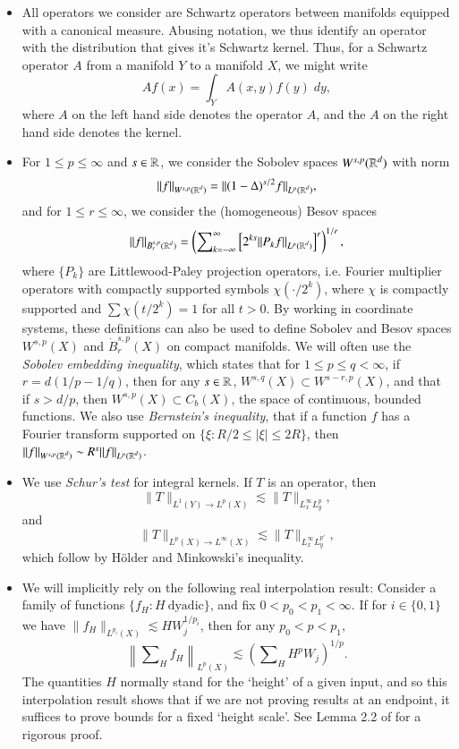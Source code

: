 \begin{itemize}
    \item All operators we consider are Schwartz operators between manifolds equipped with a canonical measure. Abusing notation, we thus identify an operator with the distribution that gives it's Schwartz kernel. Thus, for a Schwartz operator $A$ from a manifold $Y$ to a manifold $X$, we might write
    \[ A f(x) = \int_Y A(x,y) f(y)\; dy, \]
    where $A$ on the left hand side denotes the operator $A$, and the $A$ on the right hand side denotes the kernel.

    \item For $1 \leq p \leq \infty$ and $s \in \operatorname{\mathbb{R}}$, we consider the Sobolev spaces $W^{s,p}(\operatorname{\mathbb{R}}^d)$ with norm
    \[ \| f \|_{W^{s,p}(\operatorname{\mathbb{R}}^d)} = \| (1-\Delta)^{s/2} f \|_{L^p(\operatorname{\mathbb{R}}^d)}, \]
    and for $1 \leq r \leq \infty$, we consider the (homogeneous) Besov spaces
    \[ \| f \|_{\dot{B}^{s,p}_r(\operatorname{\mathbb{R}}^d)} = \left( \sum\nolimits_{k = -\infty}^\infty \left[ 2^{ks} \| P_k f \|_{L^p(\operatorname{\mathbb{R}}^d)} \right]^r \right)^{1/r}, \]
    where $\{ P_k \}$ are Littlewood-Paley projection operators, i.e. Fourier multiplier operators with compactly supported symbols $\chi( \cdot / 2^k )$, where $\chi$ is compactly supported and $\sum \chi(t/2^k) = 1$ for all $t > 0$. By working in coordinate systems, these definitions can also be used to define Sobolev and Besov spaces $W^{s,p}(X)$ and $\dot{B}^{s,p}_r(X)$ on compact manifolds. We will often use the \emph{Sobolev embedding inequality}, which states that for $1 \leq p \leq q < \infty$, if $r = d(1/p - 1/q)$, then for any $s \in \operatorname{\mathbb{R}}$, $W^{s,q}(X) \subset W^{s - r, p}(X)$, and that if $s > d/p$, then $W^{s,p}(X) \subset C_b(X)$, the space of continuous, bounded functions. We also use \emph{Bernstein's inequality}, that if a function $f$ has a Fourier transform supported on $\{ \xi : R/2 \leq |\xi| \leq 2R \}$, then $\| f \|_{W^{s,p}(\operatorname{\mathbb{R}}^d)} \sim R^s \| f \|_{L^p(\operatorname{\mathbb{R}}^d)}$.

    \item We use \emph{Schur's test} for integral kernels. If $T$ is an operator, then
    \[ \| T \|_{L^1(Y) \to L^p(X)} \lesssim \| T \|_{L^\infty_x L^p_y}, \]
    and
    \[ \| T \|_{L^p(X) \to L^\infty(X)} \lesssim \| T \|_{L^\infty_x L^{p'}_y}, \]
    which follow by H\"{o}lder and Minkowski's inequality.

    \item We will implicitly rely on the following real interpolation result: Consider a family of functions $\{ f_H: H\ \text{dyadic} \}$, and fix $0 < p_0 < p_1 < \infty$. If for $i \in \{ 0,1 \}$ we have $\| f_H \|_{L^{p_i}(X)} \lesssim H W_j^{1/p_i}$, then for any $p_0 < p < p_1$,
    \[ \left\| \sum\nolimits_H f_H \right\|_{L^p(X)} \lesssim \left( \sum\nolimits_H H^p W_j \right)^{1/p}. \]
    The quantities $H$ normally stand for the `height' of a given input, and so this interpolation result shows that if we are not proving results at an endpoint, it suffices to prove bounds for a fixed `height scale'. See Lemma 2.2 of \cite{HeoandNazarovandSeeger} for a rigorous proof.


\end{itemize}
